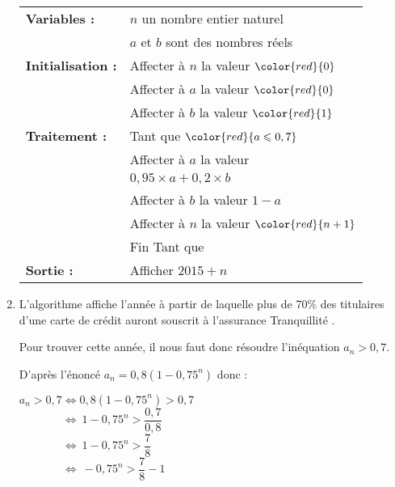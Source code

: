 \begin{corrige}
\begin{enumerate}
\begin{center}
          \begin{extern}%
               \begin{tabular}{|l l|}\hline
                    \textbf{Variables :}	& 	$n$ un nombre entier naturel \\
                    &$a$ et $b$ sont des nombres réels\\
                    \textbf{Initialisation :}	& Affecter à $n$ la valeur $\color{red}{0}$\\
                    & Affecter à $a$ la valeur $\color{red}{0}$\\
                    & Affecter à $b$ la valeur $\color{red}{1}$\\
                    \textbf{Traitement :} & Tant que $\color{red}{a \leqslant 0,7}$ \\
                    &\qquad Affecter à $a$ la valeur \\
                    &\qquad \phantom{Affecter }$0,95 \times a + 0,2 \times b$\\
                    &\qquad Affecter à $b$ la valeur $1-a$ \\
                    &\qquad Affecter à $n$ la valeur $\color{red}{n+1}$ \\
                    &Fin Tant que\\
                    \textbf{Sortie :}		&Afficher $2015+n$ \\ \hline
               \end{tabular}
          \end{extern}
     \end{center}
     \item
     L'algorithme affiche l'année à partir de laquelle plus de 70\% des titulaires d'une carte de crédit auront souscrit à l'assurance \og Tranquillité \fg{}.
     \par
     Pour trouver cette année, il nous faut donc résoudre l'inéquation $a_n > 0,7$.
     \par
     D'après l'énoncé $a_{n}=0,8(1-0,75^n)$ donc :
     \par
     $a_n > 0,7  \Leftrightarrow 0,8(1-0,75^n) > 0,7$\\
     $\phantom{ a_n > 0,7 } \Leftrightarrow \  1-0,75^n > \dfrac{0,7}{0,8}$ \\
     $\phantom{ a_n > 0,7 } \Leftrightarrow \  1-0,75^n > \dfrac{7}{8}$ \\
     $\phantom{ a_n > 0,7 } \Leftrightarrow \  -0,75^n  > \dfrac{7}{8}-1 $\\

\end{enumerate}
\end{corrige}
